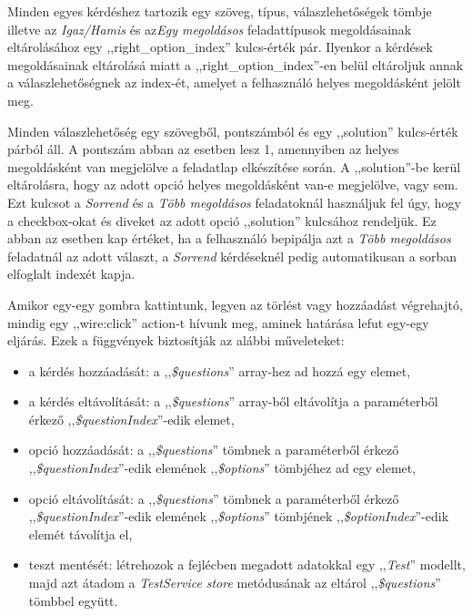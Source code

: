 \documentclass[
]{thesis-ekf}
\theoremstyle{definition}
\theoremstyle{remark}
\begin{document}
            Minden egyes kérdéshez tartozik egy szöveg, típus, válaszlehetőségek tömbje illetve az \emph{Igaz/Hamis} és  az\emph{Egy megoldásos} feladattípusok megoldásainak eltárolásához egy ,,right\_option\_index'' kulcs-érték pár. Ilyenkor a kérdések megoldásainak eltárolásá miatt a ,,right\_option\_index''-en belül eltároljuk annak a válaszlehetőségnek az index-ét, amelyet a felhasználó helyes megoldásként jelölt meg.

            Minden válaszlehetőség egy szövegből, pontszámból és egy ,,solution'' kulcs-érték párból áll. A pontszám abban az esetben lesz 1, amennyiben az helyes megoldásként van megjelölve a feladatlap elkészítése során. A ,,solution''-be kerül eltárolásra, hogy az adott opció helyes megoldásként van-e megjelölve, vagy sem. Ezt kulcsot a \emph{Sorrend} és a \emph{Több megoldásos} feladatoknál használjuk fel úgy, hogy a checkbox-okat és diveket az adott opció ,,solution'' kulcsához rendeljük. Ez abban az esetben kap értéket, ha a felhasználó bepipálja azt a \emph{Több megoldásos} feladatnál az adott választ, a \emph{Sorrend} kérdéseknél pedig automatikusan a sorban elfoglalt indexét kapja.

             Amikor egy-egy gombra kattintunk, legyen az törlést vagy hozzáadást végrehajtó, mindig egy ,,wire:click'' action-t hívunk meg, aminek határása lefut egy-egy eljárás. Ezek a függvények biztosítják az alábbi műveleteket:
            \begin{itemize}
                \item a kérdés hozzáadását: a ,,\emph{\$questions}'' array-hez ad hozzá egy elemet,
                \item a kérdés eltávolítását: a ,,\emph{\$questions}'' array-ből eltávolítja a paraméterből érkező ,,\emph{\$questionIndex}''-edik elemet,

                \item opció hozzáadását: a ,,\emph{\$questions}'' tömbnek a paraméterből érkező ,,\emph{\$questionIndex}''-edik elemének ,,\emph{\$options}'' tömbjéhez ad egy elemet,
                \item opció eltávolítását: a ,,\emph{\$questions}'' tömbnek a paraméterből érkező ,,\emph{\$questionIndex}''-edik elemének ,,\emph{\$options}'' tömbjének ,,\emph{\$optionIndex}''-edik elemét távolítja el,
                
                \item teszt mentését: létrehozok a fejlécben megadott adatokkal egy ,,\emph{Test}'' modellt, majd azt átadom a \emph{TestService} \emph{store} metódusának az eltárol ,,\emph{\$questions}'' tömbbel együtt.
            \end{itemize}
            
\end{document}
